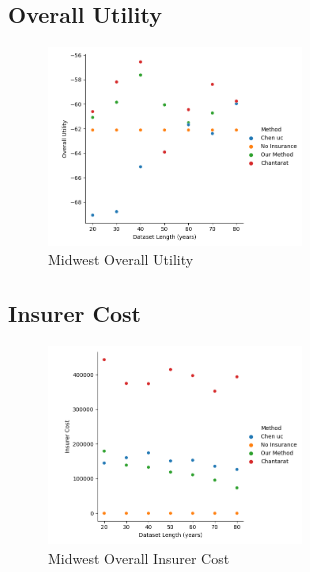 \documentclass[11pt]{article}
\begin{document}
    \subsection{Overall Utility}
    \begin{figure}[h]
        \caption{Midwest Overall Utility}
        \centering
        \includegraphics[width=0.6\textwidth]{../../../output/figures/Midwest Evaluation/Midwest_Overall Utility_Length.png}
        
    \end{figure}
    \FloatBarrier

    \subsection{Insurer Cost}
    \begin{figure}[h]
        \caption{Midwest Overall Insurer Cost}
    \centering
    \includegraphics[width=0.6\textwidth]{../../../output/figures/Midwest Evaluation/Midwest_Insurer Cost_Length.png}
    
    \end{figure}
    \FloatBarrier
\end{document}
